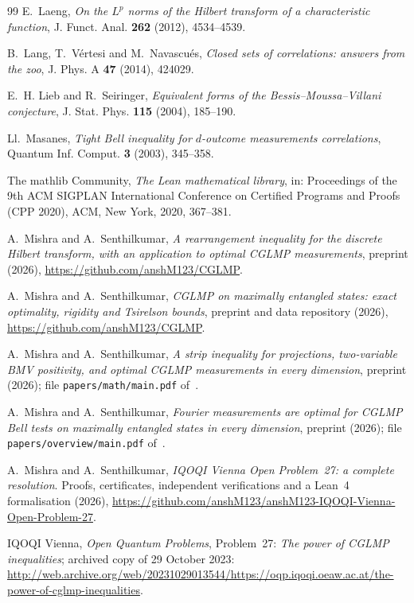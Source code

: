 \documentclass[11pt]{article}
\theoremstyle{remark}
\numberwithin{equation}{section}
\begin{document}
\begin{thebibliography}{99}
E.~Laeng, \emph{On the $L^p$ norms of the Hilbert transform of a characteristic function}, J. Funct. Anal. \textbf{262}
(2012), 4534--4539.

B.~Lang, T.~V\'ertesi and M.~Navascu\'es, \emph{Closed sets of correlations: answers from the zoo}, J. Phys. A
\textbf{47} (2014), 424029.

E.~H. Lieb and R.~Seiringer, \emph{Equivalent forms of the Bessis--Moussa--Villani conjecture}, J. Stat. Phys.
\textbf{115} (2004), 185--190.

Ll.~Masanes, \emph{Tight Bell inequality for $d$-outcome measurements correlations}, Quantum Inf. Comput. \textbf{3}
(2003), 345--358.

The mathlib Community, \emph{The Lean mathematical library}, in: Proceedings of the 9th ACM SIGPLAN International
Conference on Certified Programs and Proofs (CPP 2020), ACM, New York, 2020, 367--381.

A.~Mishra and A.~Senthilkumar, \emph{A rearrangement inequality for the discrete Hilbert transform, with an application
to optimal CGLMP measurements}, preprint (2026), \url{https://github.com/anshM123/CGLMP}.

A.~Mishra and A.~Senthilkumar, \emph{CGLMP on maximally entangled states: exact optimality, rigidity and Tsirelson
bounds}, preprint and data repository (2026), \url{https://github.com/anshM123/CGLMP}.

A.~Mishra and A.~Senthilkumar, \emph{A strip inequality for projections, two-variable BMV positivity, and optimal CGLMP
measurements in every dimension}, preprint (2026); file \texttt{papers/math/main.pdf} of~\cite{repo}.

A.~Mishra and A.~Senthilkumar, \emph{Fourier measurements are optimal for CGLMP Bell tests on maximally entangled
states in every dimension}, preprint (2026); file \texttt{papers/overview/main.pdf} of~\cite{repo}.

A.~Mishra and A.~Senthilkumar, \emph{IQOQI Vienna Open Problem~27: a complete resolution}. Proofs, certificates,
independent verifications and a Lean~4 formalisation (2026),
\url{https://github.com/anshM123/anshM123-IQOQI-Vienna-Open-Problem-27}.

IQOQI Vienna, \emph{Open Quantum Problems}, Problem~27: \emph{The power of CGLMP inequalities}; archived copy of 29
October 2023:
\url{http://web.archive.org/web/20231029013544/https://oqp.iqoqi.oeaw.ac.at/the-power-of-cglmp-inequalities}.


\end{thebibliography}
\end{document}
